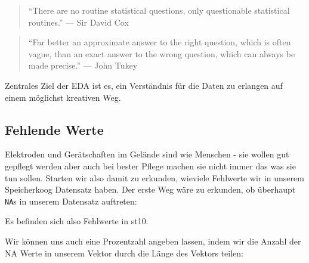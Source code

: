 \documentclass[
]{article}
\newenvironment{Shaded}{\begin{snugshade}}{\end{snugshade}}
\newcommand{\AttributeTok}[1]{\textcolor[rgb]{0.77,0.63,0.00}{#1}}
\newcommand{\CommentTok}[1]{\textcolor[rgb]{0.56,0.35,0.01}{\textit{#1}}}
\newcommand{\DecValTok}[1]{\textcolor[rgb]{0.00,0.00,0.81}{#1}}
\newcommand{\DocumentationTok}[1]{\textcolor[rgb]{0.56,0.35,0.01}{\textbf{\textit{#1}}}}
\newcommand{\FunctionTok}[1]{\textcolor[rgb]{0.00,0.00,0.00}{#1}}
\newcommand{\NormalTok}[1]{#1}
\newcommand{\SpecialCharTok}[1]{\textcolor[rgb]{0.00,0.00,0.00}{#1}}
\begin{document}
\begin{quote}
``There are no routine statistical questions, only questionable statistical routines.'' --- Sir David Cox
\end{quote}

\begin{quote}
``Far better an approximate answer to the right question, which is often vague, than an exact answer to the wrong question, which can always be made precise.'' --- John Tukey
\end{quote}

Zentrales Ziel der EDA ist es, ein Verständnis für die Daten zu erlangen auf einem möglichst kreativen Weg.

\hypertarget{fehlende-werte-1}{%
\subsection{Fehlende Werte}\label{fehlende-werte-1}}

Elektroden und Gerätschaften im Gelände sind wie Menschen - sie wollen gut gepflegt werden aber auch bei bester Pflege machen sie nicht immer das was sie tun sollen. Starten wir also damit zu erkunden, wieviele Fehlwerte wir in unserem Speicherkoog Datensatz haben. Der erste Weg wäre zu erkunden, ob überhaupt \texttt{NA}s in unserem Datensatz auftreten:

\begin{Shaded}
\end{Shaded}

Es befinden sich also Fehlwerte in st10.

\begin{Shaded}
\end{Shaded}

Wir können uns auch eine Prozentzahl angeben lassen, indem wir die Anzahl der NA Werte in unserem Vektor durch die Länge des Vektors teilen:
\end{document}

